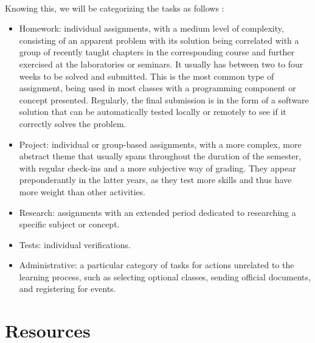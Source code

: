 ~

Knowing this, we will be categorizing the tasks as follows :
\begin{itemize}
            \setlength{\topsep}{0.5pt}
            \setlength{\itemsep}{0.5pt}
            \setlength{\parsep}{0.5pt}
            \item Homework: individual assignments, with a medium level of complexity, consisting of an apparent problem with its solution being correlated with a group of recently taught chapters in the corresponding course and further exercised at the laboratories or seminars. It usually has between two to four weeks to be solved and submitted. This is the most common type of assignment, being used in most classes with a programming component or concept presented. Regularly, the final submission is in the form of a software solution that can be automatically tested locally or remotely to see if it correctly solves the problem.

            \item Project: individual or group-based assignments, with a more complex, more abstract theme that usually spans throughout the duration of the semester, with regular check-ins and a more subjective way of grading. They appear preponderantly in the latter years, as they test more skills and thus have more weight than other activities.
            \item Research: assignments with an extended period dedicated to researching a specific subject or concept.
            \item Tests: individual verifications.
            \item Administrative: a particular category of tasks for actions unrelated to the learning process, such as selecting optional classes, sending official documents, and registering for events.

\end{itemize}

\section{Resources} \label{2:resources}


